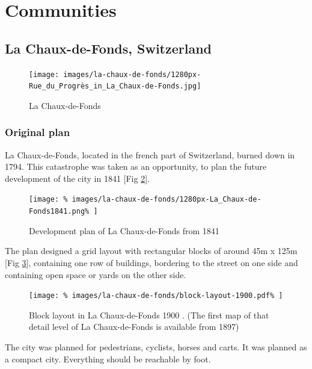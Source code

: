 \documentclass{article}
\begin{document}
	\clearpage	
	\section{Communities}
	
		\subsection{La Chaux-de-Fonds, Switzerland}		
		\begin{figure}[H]
	 		\texttt{[image: images/la-chaux-de-fonds/1280px-Rue\_du\_Progrès\_in\_La\_Chaux-de-Fonds.jpg]}
 			\caption{La Chaux-de-Fonds \cite{Wikimedia:RueDuProgressLaChauxDeFonds}}
 			\label{fig:img:la-chaux-de-fonds}
	 	\end{figure}
		
		\begin{multicols}{2}
	      \raggedcolumns
		
			\subsubsection{Original plan}
			La Chaux-de-Fonds, located in the french part of Switzerland, burned down in 1794.
			This catastrophe was taken as an opportunity, to plan the future development of the city in 1841 [Fig \ref{fig:map:plan-la-chaux-de-fonds-1841}].
		
			\begin{figure}[H]
				\texttt{[image: \%
					images/la-chaux-de-fonds/1280px-La\_Chaux-de-Fonds1841.png\%
				]}
				\caption{Development plan of La Chaux-de-Fonds from 1841 \cite{Wikimedia:LaChauxDeFonds1841}}
				\label{fig:map:plan-la-chaux-de-fonds-1841}
			\end{figure}
			
			The plan designed a grid layout with rectangular blocks of around 45m x 125m [Fig \ref{fig:img:la-chaux-de-fonds-block-layout-1900}], containing one row of buildings, bordering to the street on one side and containing open space or yards on the other side.
			
			\begin{figure}[H]
				\texttt{[image: \%
					images/la-chaux-de-fonds/block-layout-1900.pdf\%
				]}
				\caption{Block layout in La Chaux-de-Fonds 1900  \cite{MapGeoAdmin:LaChauxDeFonds}. (The first map of that detail level of La Chaux-de-Fonds is available from 1897)}
				\label{fig:img:la-chaux-de-fonds-block-layout-1900}
			\end{figure}
			
			The city was planned for pedestrians, cyclists, horses and carts.
			It was planned as a compact city. Everything should be reachable by foot.
			

\end{multicols}
\end{document}
